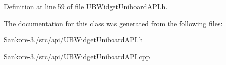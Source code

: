 Definition at line 59 of file U\-B\-Widget\-Uniboard\-A\-P\-I.\-h.



The documentation for this class was generated from the following files\-:\begin{DoxyCompactItemize}
\item 
Sankore-\/3./src/api/\hyperlink{_u_b_widget_uniboard_a_p_i_8h}{U\-B\-Widget\-Uniboard\-A\-P\-I.\-h}\item 
Sankore-\/3./src/api/\hyperlink{_u_b_widget_uniboard_a_p_i_8cpp}{U\-B\-Widget\-Uniboard\-A\-P\-I.\-cpp}\end{DoxyCompactItemize}
